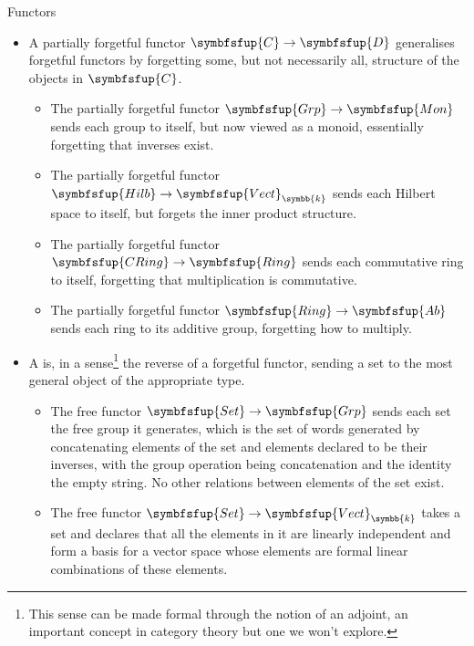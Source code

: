 \documentclass[fleqn]{NotesClass}
\makeatletter
\newcommand{\cat}[1]{\symbfsfup{#1}}
\newcommand{\c@egory}[1]{\symbfsfup{#1}}
\newcommand{\Set}{\c@egory{Set}}
\renewcommand{\field}{\symbb{k}}
\newcommand{\Vect}[1][\field]{{\c@egory{Vect}_{#1}}}
\newcommand{\Hilb}{\c@egory{Hilb}}
\newcommand{\Mon}{\c@egory{Mon}}
\newcommand{\Grp}{\c@egory{Grp}}
\newcommand{\Ring}{\c@egory{Ring}}
\newcommand{\CRing}{\c@egory{CRing}}
\newcommand{\Top}{\c@egory{Top}}
\newcommand{\Ab}{\c@egory{Ab}}
\makeatother
\begin{document}
\begin{exm}{Functors}{}
\begin{itemize}
            \begin{itemize}
                \item The forgetful functor \(U \colon \Grp \to \Set\) sends each group to its underlying set and each group homomorphism to its underlying function.
                \item The forgetful functor \(U \colon \Vect \to \Set\) sends each vector space to its underlying set and each linear transformation to its underlying function.
                \item The forgetful functor \(U \colon \Top \to \Set\) sends each topological space to its underlying set and each continuous function to its underlying function.
            \end{itemize}
            \item A partially forgetful functor \(\cat{C} \to \cat{D}\) generalises forgetful functors by forgetting some, but not necessarily all, structure of the objects in \(\cat{C}\).
            \begin{itemize}
                \item The partially forgetful functor \(\Grp \to \Mon\) sends each group to itself, but now viewed as a monoid, essentially forgetting that inverses exist.
                \item The partially forgetful functor \(\Hilb \to \Vect\) sends each Hilbert space to itself, but forgets the inner product structure.
                \item The partially forgetful functor \(\CRing \to \Ring\) sends each commutative ring to itself, forgetting that multiplication is commutative.
                \item The partially forgetful functor \(\Ring \to \Ab\) sends each ring to its additive group, forgetting how to multiply.
            \end{itemize}
            \item A  is, in a sense\footnote{This sense can be made formal through the notion of an adjoint, an important concept in category theory but one we won't explore.} the reverse of a forgetful functor, sending a set to the most general object of the appropriate type.
            \begin{itemize}
                \item The free functor \(\Set \to \Grp\) sends each set the free group it generates, which is the set of words generated by concatenating elements of the set and elements declared to be their inverses, with the group operation being concatenation and the identity the empty string.
                No other relations between elements of the set exist.
                \item The free functor \(\Set \to \Vect\) takes a set and declares that all the elements in it are linearly independent and form a basis for a vector space whose elements are formal linear combinations of these elements.
            \end{itemize}
        \end{itemize}
    \end{exm}
    
\end{document}

